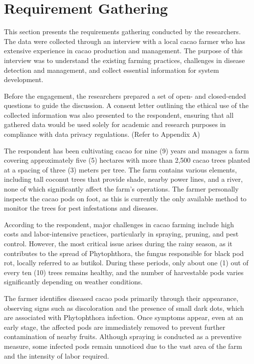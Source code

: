 \section{Requirement Gathering}

This section presents the requirements gathering conducted by the researchers. The data were collected through an interview with a local cacao farmer who has extensive experience in cacao production and management. The purpose of this interview was to understand the existing farming practices, challenges in disease detection and management, and collect essential information for system development. 

Before the engagement, the researchers prepared a set of open- and closed-ended questions to guide the discussion. A consent letter outlining the ethical use of the collected information was also presented to the respondent, ensuring that all gathered data would be used solely for academic and research purposes in compliance with data privacy regulations. (Refer to Appendix A) 

The respondent has been cultivating cacao for nine (9) years and manages a farm covering approximately five (5) hectares with more than 2,500 cacao trees planted at a spacing of three (3) meters per tree. The farm contains various elements, including tall coconut trees that provide shade, nearby power lines, and a river, none of which significantly affect the farm’s operations. The farmer personally inspects the cacao pods on foot, as this is currently the only available method to monitor the trees for pest infestations and diseases.

According to the respondent, major challenges in cacao farming include high costs and labor-intensive practices, particularly in spraying, pruning, and pest control. However, the most critical issue arises during the rainy season, as it contributes to the spread of Phytophthora, the fungus responsible for black pod rot, locally referred to as butikol. During these periods, only about one (1) out of every ten (10) trees remains healthy, and the number of harvestable pods varies significantly depending on weather conditions.

The farmer identifies diseased cacao pods primarily through their appearance, observing signs such as discoloration and the presence of small dark dots, which are associated with Phytophthora infection. Once symptoms appear, even at an early stage, the affected pods are immediately removed to prevent further contamination of nearby fruits. Although spraying is conducted as a preventive measure, some infected pods remain unnoticed due to the vast area of the farm and the intensity of labor required.

